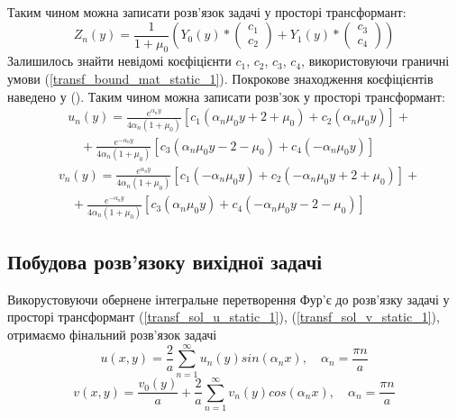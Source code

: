 Таким чином можна записати розв'язок задачі у просторі трансформант:
\begin{equation}
    Z_n(y) = \frac{1}{1 + \mu_0} \left( Y_0(y) * \begin{pmatrix} c_1 \\ c_2 \end{pmatrix} +  Y_1(y) * \begin{pmatrix} c_3 \\ c_4 \end{pmatrix}  \right)
\end{equation}
Залишилось знайти невідомі коєфіцієнти $c_1$, $c_2$, $c_3$, $c_4$, використовуючи граничні умови (\ref{transf_bound_mat_static_1}).
Покрокове знаходження коєфіцієнтів наведено у ().
Таким чином можна записати розв'зок у просторі трансформант:
\begin{align}\label{transf_sol_u_static_1}
    &u_n(y) = \frac{e^{\alpha_n y}}{4 \alpha_n (1 + \mu_0)} \left[c_1 (\alpha_n \mu_0 y + 2 + \mu_0) + c_2 (\alpha_n \mu_0 y) \right] + \nonumber \\
    &\quad + \frac{e^{-\alpha_n y}}{4 \alpha_n (1 + \mu_0)} \left[c_3 (\alpha_n \mu_0 y - 2 - \mu_0) + c_4 (-\alpha_n \mu_0 y)\right]
\end{align}
\begin{align}\label{transf_sol_v_static_1}
    &v_n(y) = \frac{e^{\alpha_n y}}{4 \alpha_n (1 + \mu_0)} \left[c_1 (-\alpha_n \mu_0 y) + c_2 (-\alpha_n \mu_0 y + 2 + \mu_0) \right] + \nonumber \\
    &\quad + \frac{e^{-\alpha_n y}}{4 \alpha_n (1 + \mu_0)} \left[c_3 (\alpha_n \mu_0 y) + c_4 (-\alpha_n \mu_0 y - 2 - \mu_0)\right]
\end{align}

\subsection{Побудова розв'язоку вихідної задачі}
Викорустовуючи обернене інтегральне перетворення Фур'є до розв'язку задачі у просторі трансформант
(\ref{transf_sol_u_static_1}), (\ref{transf_sol_v_static_1}), отримаємо фінальний розв'язок задачі
\begin{equation}
    u(x,y) = \frac{2}{a} \sum_{n=1}^{\infty} u_n(y) sin(\alpha_n x), \quad \alpha_n = \frac{\pi n}{a}
\end{equation}
\begin{equation}
    v(x,y) = \frac{v_0(y)}{a} + \frac{2}{a} \sum_{n=1}^{\infty} v_n(y) cos(\alpha_n x), \quad \alpha_n = \frac{\pi n}{a}
\end{equation}

